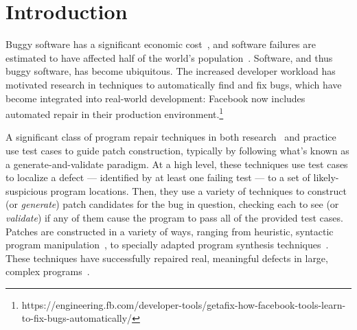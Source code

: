\documentclass[sigconf, timestamp-false, anonymous=true]{acmart}
\begin{document}

\maketitle


\newcommand{\rqorinsight}[2]{
  \setlength{\fboxsep}{0.8em}
  \vspace{0.5em}
  \begin{center}
  \Ovalbox{\begin{minipage}{0.9\linewidth}
    \textbf{RQ#1:} #2
    \end{minipage}}
  \end{center}
  \vspace{0.5em}}

\section{Introduction}

Buggy software has a significant economic cost~\cite{cambridge-study}, and
software failures are estimated to have affected half of the world's
population~\cite{tricentis}. Software, and thus buggy software, has become
ubiquitous. The increased developer workload has motivated research in
techniques to automatically find and fix bugs, which have become integrated into
real-world development: Facebook now includes automated repair in their
production
environment.\footnote{https://engineering.fb.com/developer-tools/getafix-how-facebook-tools-learn-to-fix-bugs-automatically/}

A significant class of program repair techniques in both
research~\cite{genprog,angelix,Le17, Xuan17} and practice~\cite{sapfix} use test
cases to guide patch construction, typically by following what's known as a
generate-and-validate paradigm. At a high level, these techniques use test cases
to localize a defect --- identified by at least one failing test --- to a set of
likely-suspicious program locations. Then, they use a variety of techniques to
construct (or \emph{generate}) patch candidates for the bug in question,
checking each to see (or \emph{validate}) if any of them cause the program to
pass all of the provided test cases.
%
Patches are constructed in a variety of ways, ranging from heuristic, syntactic
program manipulation~\cite{par,genprog,rsrepair,ae,prophet,hdrepair}, to specially adapted program
synthesis techniques~\cite{Konighofer11,Konighofer12,semfix,DeMarco14,angelix}. These techniques have successfully
repaired real, meaningful defects in large, complex
programs~\cite{angelix,genprog-eight-dollars,prophet,sapfix}.
\end{document}

